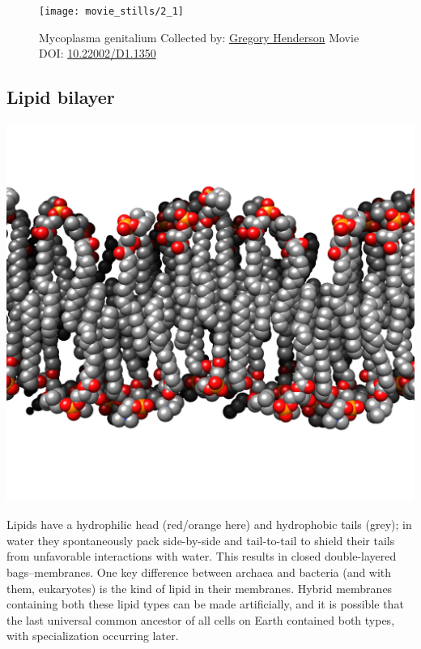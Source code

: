 \documentclass[]{tufte-book}
\begin{document}
\begin{figure}
\texttt{[image: movie\_stills/2\_1]} \caption[Mycoplasma genitalium Collected by:
\protect\hyperlink{gregory_henderson}{Gregory Henderson} Movie DOI:
\href{https://doi.org/10.22002/D1.1350}{10.22002/D1.1350}]{Mycoplasma genitalium Collected by:
\protect\hyperlink{gregory_henderson}{Gregory Henderson} Movie DOI:
\href{https://doi.org/10.22002/D1.1350}{10.22002/D1.1350}}\label{fig:2-1}
\end{figure}

\subsection{Lipid bilayer}\label{Lipid_bilayer}

\includegraphics{img/schematics/2_1_1}

Lipids have a hydrophilic head (red/orange here) and hydrophobic tails
(grey); in water they spontaneously pack side-by-side and tail-to-tail
to shield their tails from unfavorable interactions with water. This
results in closed double-layered bags--membranes. One key difference
between archaea and bacteria (and with them, eukaryotes) is the kind of
lipid in their membranes. Hybrid membranes containing both these lipid
types can be made artificially, and it is possible that the last
universal common ancestor of all cells on Earth contained both types,
with specialization occurring later.
\end{document}
